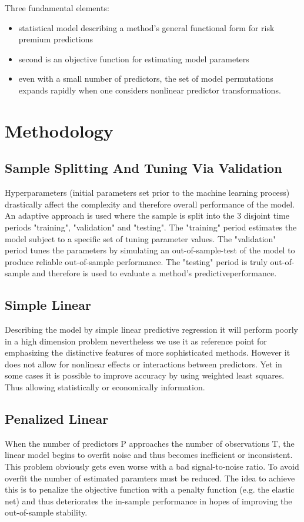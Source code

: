 \documentclass{article}
\begin{document}
Three fundamental elements:
\begin{itemize}
\item statistical model describing a method’s general functional form for risk premium
predictions
\item second is an objective function for estimating model parameters
\item even with a small number of predictors, the set of model permutations expands rapidly when one considers nonlinear predictor
transformations.
\end{itemize}

\section{Methodology}

\subsection{Sample Splitting And Tuning Via Validation}
	Hyperparameters (initial parameters set prior to the machine learning process)
	drastically affect the complexity and therefore overall performance of the model.
	An adaptive approach is used where the sample is split into the 3 disjoint time periods
	"training", "validation" and "testing". The "training" period estimates the model
	subject to a specific set of tuning parameter values. The "validation" period
	tunes the parameters by simulating an out-of-sample-test of the model
	to produce reliable out-of-sample performance. The "testing" period is truly
	out-of-sample and therefore is used to evaluate a method’s predictiveperformance.

\subsection{Simple Linear}
	Describing the model by simple linear predictive regression it will perform poorly in a high 
	dimension problem nevertheless we use it as reference point for emphasizing the distinctive 
	features of more sophisticated methods.
	However it does not allow for nonlinear effects or interactions between predictors.
	Yet in some cases it is possible to improve accuracy by using weighted least squares.
	Thus allowing statistically or economically information.
	
\subsection{Penalized Linear}
	When the number of predictors P approaches the number of observations T,
	the linear model begins to overfit noise and thus becomes inefficient or inconsistent.
	This problem obviously gets even worse with a bad signal-to-noise ratio.
	To avoid overfit the number of estimated paramters must be reduced.
	The idea to achieve this is to penalize the objective function with a penalty
	function (e.g. the elastic net) and thus deteriorates the in-sample performance
	in hopes of improving the out-of-sample stability.
\end{document}
